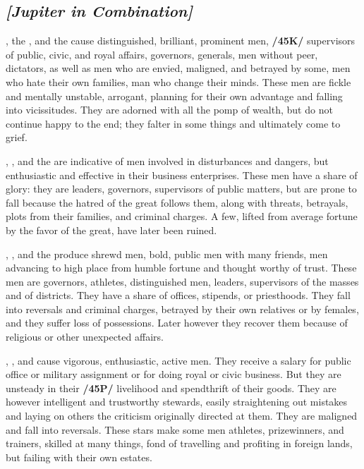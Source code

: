 \secbr
{}
\subsection{\textit{[Jupiter in Combination]}}
\Jupiter, the \Sun, and the \Moon\xspace cause distinguished, brilliant, prominent men, \textbf{/45K/} supervisors of
public, civic, and royal affairs, governors, generals, men without peer, dictators, as well as men who are envied, maligned, and betrayed by some, men who hate their own families, man who change their minds. These men are fickle and mentally unstable, arrogant, planning for their own advantage and falling into vicissitudes. They are adorned with all the pomp of wealth, but do not continue happy to the end; they
falter in some things and ultimately come to grief.

\Jupiter, \Mars, and the \Sun\xspace are indicative of men involved in disturbances and dangers, but enthusiastic
and effective in their business enterprises. These men have a share of glory: they are leaders, governors, supervisors of public matters, but are prone to fall because the hatred of the great follows them, along with threats, betrayals, plots from their families, and criminal charges. A few, lifted from average fortune by the favor of the great, have later been ruined.

\Jupiter, \Mars, and the \Moon\xspace produce shrewd men, bold, public men with many friends, men advancing to high place from humble fortune and thought worthy of trust. These men are governors, athletes, distinguished men, leaders, supervisors of the masses and of districts. They have a share of offices, stipends, or priesthoods. They fall into reversals and criminal charges, betrayed by their own relatives or by females, and they suffer loss of possessions. Later however they recover them because of religious or other unexpected affairs.

\Jupiter, \Mars, and \Mercury\xspace cause vigorous, enthusiastic, active men. They receive a salary for public
office or military assignment or for doing royal or civic business. But they are unsteady in their \textbf{/45P/}
livelihood and spendthrift of their goods. They are however intelligent and trustworthy stewards, easily straightening out mistakes and laying on others the criticism originally directed at them. They are maligned and fall into reversals. These stars make some men athletes, prizewinners, and trainers, skilled at many things, fond of travelling and profiting in foreign lands, but failing with their own estates. 

